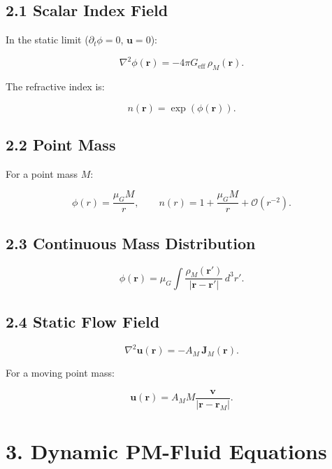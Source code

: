 \documentclass{article}
\begin{document}
\subsection*{2.1 Scalar Index Field}

In the static limit ($\partial_t \phi = 0$, $\mathbf u = 0$):



\[
\nabla^2 \phi(\mathbf r)
=
-4\pi G_{\mathrm{eff}}\,\rho_M(\mathbf r).
\]



The refractive index is:



\[
n(\mathbf r) = \exp(\phi(\mathbf r)).
\]



\subsection*{2.2 Point Mass}

For a point mass $M$:



\[
\phi(r) = \frac{\mu_G M}{r},
\qquad
n(r) = 1 + \frac{\mu_G M}{r} + \mathcal{O}(r^{-2}).
\]



\subsection*{2.3 Continuous Mass Distribution}



\[
\phi(\mathbf r)
=
\mu_G
\int
\frac{\rho_M(\mathbf r')}{|\mathbf r - \mathbf r'|}
\,d^3r'.
\]



\subsection*{2.4 Static Flow Field}



\[
\nabla^2 \mathbf u(\mathbf r)
=
- A_M\,\mathbf J_M(\mathbf r).
\]



For a moving point mass:



\[
\mathbf u(\mathbf r)
=
A_M M
\frac{\mathbf v}{|\mathbf r - \mathbf r_M|}.
\]



\section*{3. Dynamic PM-Fluid Equations}
\end{document}

